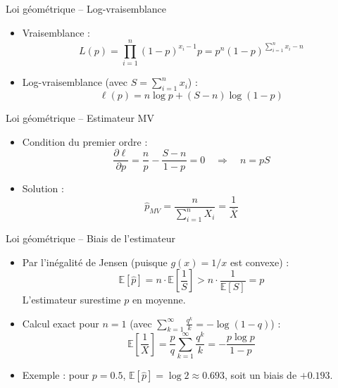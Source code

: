 \documentclass[11pt,aspectratio=169]{beamer}
\begin{document}
\begin{frame}{Loi géométrique -- Log-vraisemblance}

\begin{itemize}

\item Vraisemblance :
  \[
  L(p) = \prod_{i=1}^n (1-p)^{x_i-1} p = p^n (1-p)^{\sum_{i=1}^n x_i - n}
  \]

\item Log-vraisemblance (avec $S = \sum_{i=1}^n x_i$) :
  \[
  \ell(p) = n \log p + (S - n) \log(1-p)
  \]

\end{itemize}

\end{frame}

\begin{frame}{Loi géométrique -- Estimateur MV}

\begin{itemize}

\item Condition du premier ordre :
  \[
  \frac{\partial \ell}{\partial p} = \frac{n}{p} - \frac{S - n}{1-p} = 0 \quad \Rightarrow \quad n = pS
  \]

\item Solution :
  \[
  \boxed{\hat{p}_{MV} = \frac{n}{\sum_{i=1}^n X_i} = \frac{1}{\bar{X}}}
  \]

\end{itemize}

\end{frame}

\begin{frame}{Loi géométrique -- Biais de l'estimateur}

\begin{itemize}

\item Par l'inégalité de Jensen (puisque $g(x) = 1/x$ est convexe) :
  \[
  \mathbb{E}[\hat{p}] = n \cdot \mathbb{E}\left[\frac{1}{S}\right] > n \cdot \frac{1}{\mathbb{E}[S]} = p
  \]
  L'estimateur surestime $p$ en moyenne.\newline

\item Calcul exact pour $n = 1$ (avec $\sum_{k=1}^{\infty} \frac{q^k}{k} = -\log(1-q)$) :
  \[
  \mathbb{E}\left[\frac{1}{X}\right] = \frac{p}{q}\sum_{k=1}^{\infty} \frac{q^k}{k} = -\frac{p \log p}{1-p}
  \]

\item Exemple : pour $p = 0.5$, $\mathbb{E}[\hat{p}] = \log 2 \approx 0.693$, soit un biais de $+0.193$.

\end{itemize}

\end{frame}
\end{document}
